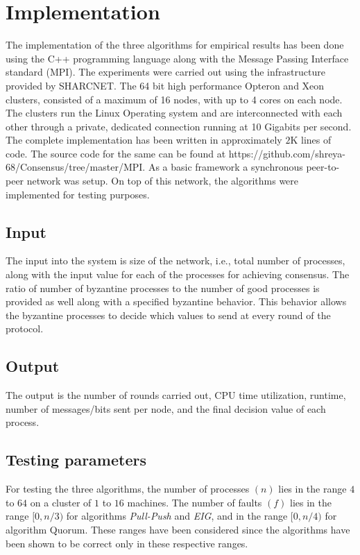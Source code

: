 ﻿\section{Implementation}
\label{sec:eval}

The implementation of the three algorithms for empirical results has been done using the C++ programming language along with the Message Passing Interface standard (MPI). The experiments were carried out using the infrastructure provided by SHARCNET. The 64 bit high performance Opteron and Xeon clusters, consisted of a maximum of 16 nodes, with up to 4 cores on each node. The clusters run the Linux Operating system and are interconnected with each other through a private, dedicated connection running at 10 Gigabits per second. The complete implementation has been written in approximately $2$K lines of code. The source code for the same can be found at https://github.com/shreya-68/Consensus/tree/master/MPI. As a basic framework a synchronous peer-to-peer network was setup. On top of this network, the algorithms were implemented for testing purposes.  

\subsection{Input}
The input into the system is size of the network, i.e., total number of processes, along with the input value for each of the processes for achieving consensus. The ratio of number of byzantine processes to the number of good processes is provided as well along with a specified byzantine behavior. This behavior allows the byzantine processes to decide which values to send at every round of the protocol. 

\subsection{Output}
The output is the number of rounds carried out, CPU time utilization, runtime, number of messages/bits sent per node, and the final decision value of each process. 

\subsection{Testing parameters}
For testing the three algorithms, the number of processes $(n)$ lies in the range $4$ to $64$ on a cluster of $1$ to $16$ machines. The number of faults $(f)$ lies in the range $[0, n/3)$ for algorithms \textit{Pull-Push} and \textit{EIG}, and in the range $[0, n/4)$ for algorithm Quorum. These ranges have been considered since the algorithms have been shown to be correct only in these respective ranges.

